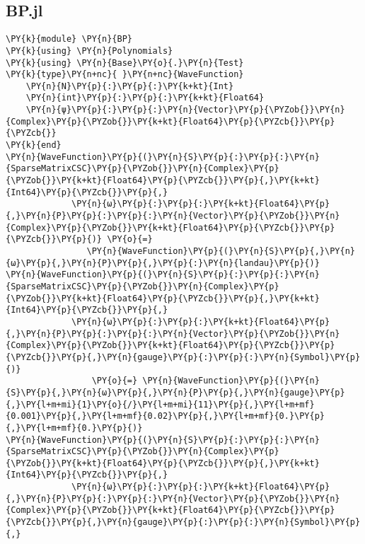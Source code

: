 
\subsection{BP.jl}\label{subsec:bp}
\begin{Verbatim}[commandchars=\\\{\}]
\PY{k}{module} \PY{n}{BP}
\PY{k}{using} \PY{n}{Polynomials}
\PY{k}{using} \PY{n}{Base}\PY{o}{.}\PY{n}{Test}
\PY{k}{type}\PY{n+nc}{ }\PY{n+nc}{WaveFunction}
    \PY{n}{N}\PY{p}{:}\PY{p}{:}\PY{k+kt}{Int}
    \PY{n}{int}\PY{p}{:}\PY{p}{:}\PY{k+kt}{Float64}
    \PY{n}{ψ}\PY{p}{:}\PY{p}{:}\PY{n}{Vector}\PY{p}{\PYZob{}}\PY{n}{Complex}\PY{p}{\PYZob{}}\PY{k+kt}{Float64}\PY{p}{\PYZcb{}}\PY{p}{\PYZcb{}}
\PY{k}{end}
\PY{n}{WaveFunction}\PY{p}{(}\PY{n}{S}\PY{p}{:}\PY{p}{:}\PY{n}{SparseMatrixCSC}\PY{p}{\PYZob{}}\PY{n}{Complex}\PY{p}{\PYZob{}}\PY{k+kt}{Float64}\PY{p}{\PYZcb{}}\PY{p}{,}\PY{k+kt}{Int64}\PY{p}{\PYZcb{}}\PY{p}{,}
             \PY{n}{ω}\PY{p}{:}\PY{p}{:}\PY{k+kt}{Float64}\PY{p}{,}\PY{n}{P}\PY{p}{:}\PY{p}{:}\PY{n}{Vector}\PY{p}{\PYZob{}}\PY{n}{Complex}\PY{p}{\PYZob{}}\PY{k+kt}{Float64}\PY{p}{\PYZcb{}}\PY{p}{\PYZcb{}}\PY{p}{)} \PY{o}{=}
                \PY{n}{WaveFunction}\PY{p}{(}\PY{n}{S}\PY{p}{,}\PY{n}{ω}\PY{p}{,}\PY{n}{P}\PY{p}{,}\PY{p}{:}\PY{n}{landau}\PY{p}{)}
\PY{n}{WaveFunction}\PY{p}{(}\PY{n}{S}\PY{p}{:}\PY{p}{:}\PY{n}{SparseMatrixCSC}\PY{p}{\PYZob{}}\PY{n}{Complex}\PY{p}{\PYZob{}}\PY{k+kt}{Float64}\PY{p}{\PYZcb{}}\PY{p}{,}\PY{k+kt}{Int64}\PY{p}{\PYZcb{}}\PY{p}{,}
             \PY{n}{ω}\PY{p}{:}\PY{p}{:}\PY{k+kt}{Float64}\PY{p}{,}\PY{n}{P}\PY{p}{:}\PY{p}{:}\PY{n}{Vector}\PY{p}{\PYZob{}}\PY{n}{Complex}\PY{p}{\PYZob{}}\PY{k+kt}{Float64}\PY{p}{\PYZcb{}}\PY{p}{\PYZcb{}}\PY{p}{,}\PY{n}{gauge}\PY{p}{:}\PY{p}{:}\PY{n}{Symbol}\PY{p}{)}
                 \PY{o}{=} \PY{n}{WaveFunction}\PY{p}{(}\PY{n}{S}\PY{p}{,}\PY{n}{ω}\PY{p}{,}\PY{n}{P}\PY{p}{,}\PY{n}{gauge}\PY{p}{,}\PY{l+m+mi}{1}\PY{o}{/}\PY{l+m+mi}{11}\PY{p}{,}\PY{l+m+mf}{0.001}\PY{p}{,}\PY{l+m+mf}{0.02}\PY{p}{,}\PY{l+m+mf}{0.}\PY{p}{,}\PY{l+m+mf}{0.}\PY{p}{)}
\PY{n}{WaveFunction}\PY{p}{(}\PY{n}{S}\PY{p}{:}\PY{p}{:}\PY{n}{SparseMatrixCSC}\PY{p}{\PYZob{}}\PY{n}{Complex}\PY{p}{\PYZob{}}\PY{k+kt}{Float64}\PY{p}{\PYZcb{}}\PY{p}{,}\PY{k+kt}{Int64}\PY{p}{\PYZcb{}}\PY{p}{,}
             \PY{n}{ω}\PY{p}{:}\PY{p}{:}\PY{k+kt}{Float64}\PY{p}{,}\PY{n}{P}\PY{p}{:}\PY{p}{:}\PY{n}{Vector}\PY{p}{\PYZob{}}\PY{n}{Complex}\PY{p}{\PYZob{}}\PY{k+kt}{Float64}\PY{p}{\PYZcb{}}\PY{p}{\PYZcb{}}\PY{p}{,}\PY{n}{gauge}\PY{p}{:}\PY{p}{:}\PY{n}{Symbol}\PY{p}{,}

\end{Verbatim}

